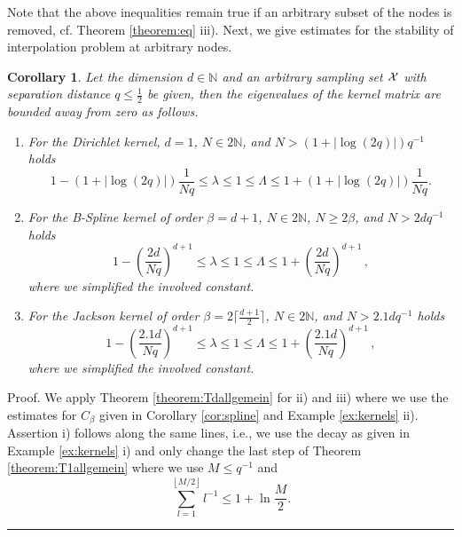 \documentclass[11pt,a4paper,bibtotoc]{scrartcl}
\def\N{\mathbb{N}}
\newcommand{\Boxgl}{\par\vspace{-5ex} \hspace*{0ex} \hfill
  \rule{1.5ex}{1.5ex} \\ \goodbreak\goodbreak}
\newtheorem{corollary}[theorem]{Corollary}
\newenvironment{Corollary}{\goodbreak \begin{corollary}\rm}{\end{corollary}}
\numberwithin{equation}{section}
\numberwithin{table}{section}
\numberwithin{figure}{section}
\begin{document}
Note that the above inequalities remain true if an arbitrary subset of the
nodes is removed, cf. Theorem \ref{theorem:eq} iii).
Next, we give estimates for the stability of interpolation problem at
arbitrary nodes.
\begin{Corollary}  \label{cor:qsep}
  Let the dimension $d\in\N$ and an arbitrary sampling set $\cal X$ with
  separation distance $q\le\frac{1}{2}$ be given, then the eigenvalues of the
  kernel matrix are bounded away from zero as follows.
  \begin{enumerate}
  \item For the Dirichlet kernel, $d=1$, $N\in 2\N$, and
    $N>\left(1+\left|\log\left(2q\right)\right|\right)q^{-1}$ holds 
    \begin{equation*}
      1- \left(1+\left|\log\left(2q\right)\right|\right)\frac{1}{Nq}
      \le \lambda \le 1 \le \Lambda \le
      1+ \left(1+\left|\log\left(2q\right)\right|\right)\frac{1}{Nq}.
    \end{equation*}
  \item For the B-Spline kernel of order $\beta=d+1$, $N\in 2\N$, $N\ge
    2\beta$, and $N>2dq^{-1}$ holds
    \begin{equation*}
      1- \left(\frac{2d}{Nq}\right)^{d+1}
      \le \lambda \le 1 \le \Lambda \le
      1+ \left(\frac{2d}{Nq}\right)^{d+1}\,,
    \end{equation*}
    where we simplified the involved constant.
  \item For the Jackson kernel of order $\beta=2\lceil\frac{d+1}{2}\rceil$,
    $N\in 2\N$, and $N>2.1 d q^{-1}$ holds
    \begin{equation*}
      1- \left(\frac{2.1d}{Nq}\right)^{d+1}
      \le \lambda \le 1 \le \Lambda \le
      1+ \left(\frac{2.1d}{Nq}\right)^{d+1}\,,
    \end{equation*}
    where we simplified the involved constant.
  \end{enumerate}
\end{Corollary}

Proof. We apply Theorem \ref{theorem:Tdallgemein} for ii) and iii) where we
 use the estimates for $C_{\beta}$ given in Corollary \ref{cor:spline} and
 Example \ref{ex:kernels} ii).
 Assertion i) follows along the same lines, i.e., we use the decay as given in
 Example \ref{ex:kernels} i) and only change the last step of Theorem
 \ref{theorem:T1allgemein} where we use $M\le q^{-1}$ and
 \begin{equation*}
   \sum\limits_{l=1}^{\left\lfloor M/2\right\rfloor} l^{-1} \le 1+\ln
   \frac{M}{2}.
 \end{equation*}
\Boxgl
\end{document}

